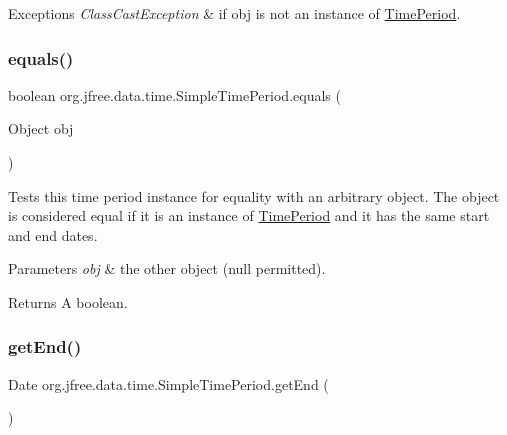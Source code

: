 \begin{DoxyExceptions}{Exceptions}
{\em Class\+Cast\+Exception} & if {\ttfamily obj} is not an instance of \mbox{\hyperlink{interfaceorg_1_1jfree_1_1data_1_1time_1_1_time_period}{Time\+Period}}. \\
\hline
\end{DoxyExceptions}
\mbox{\label{classorg_1_1jfree_1_1data_1_1time_1_1_simple_time_period_a63370386f066e52bd7fbb388ff27cfd3}} 
\subsubsection{\texorpdfstring{equals()}{equals()}}
{\footnotesize\ttfamily boolean org.\+jfree.\+data.\+time.\+Simple\+Time\+Period.\+equals (\begin{DoxyParamCaption}\item[{Object}]{obj }\end{DoxyParamCaption})}

Tests this time period instance for equality with an arbitrary object. The object is considered equal if it is an instance of \mbox{\hyperlink{interfaceorg_1_1jfree_1_1data_1_1time_1_1_time_period}{Time\+Period}} and it has the same start and end dates.


\begin{DoxyParams}{Parameters}
{\em obj} & the other object ({\ttfamily null} permitted).\\
\hline
\end{DoxyParams}
\begin{DoxyReturn}{Returns}
A boolean. 
\end{DoxyReturn}
\mbox{\label{classorg_1_1jfree_1_1data_1_1time_1_1_simple_time_period_afb5fba801200f718c01519eced7ed921}} 
\subsubsection{\texorpdfstring{get\+End()}{getEnd()}}
{\footnotesize\ttfamily Date org.\+jfree.\+data.\+time.\+Simple\+Time\+Period.\+get\+End (\begin{DoxyParamCaption}{ }\end{DoxyParamCaption})}

